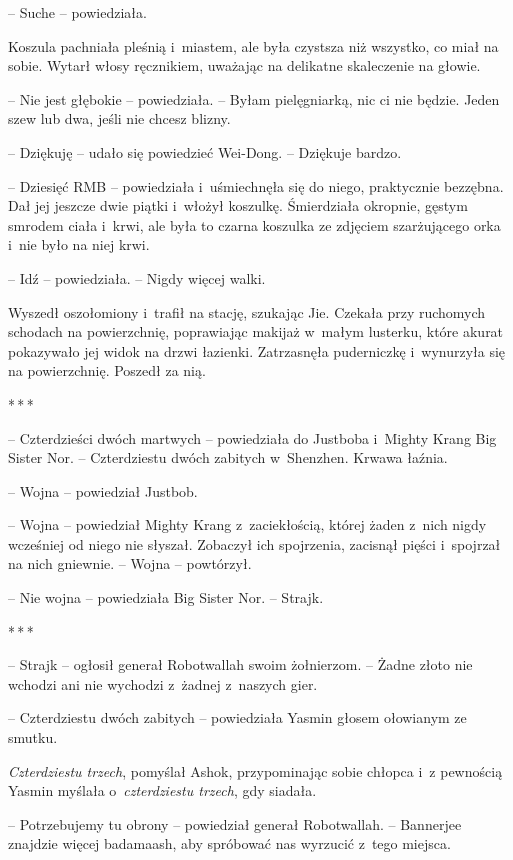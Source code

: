 \documentclass[oneside,polish,11pt,rmheadings]{mwbk}
\newcommand{\threeast}{\par\centerline{*\,*\,*}\medskip\par}
\begin{document}
-- Suche -- powiedziała.

Koszula pachniała pleśnią i~miastem, ale była czystsza niż wszystko, co miał na sobie. Wytarł włosy ręcznikiem, uważając na delikatne skaleczenie na głowie.

-- Nie jest głębokie -- powiedziała. -- Byłam pielęgniarką, nic ci nie będzie. Jeden szew lub dwa, jeśli nie chcesz blizny.

-- Dziękuję -- udało się powiedzieć Wei-Dong. -- Dziękuje bardzo. 

-- Dziesięć RMB -- powiedziała i~uśmiechnęła się do niego, praktycznie bezzębna. Dał jej jeszcze dwie piątki i~włożył koszulkę. Śmierdziała okropnie, gęstym smrodem ciała i~krwi, ale była to czarna koszulka ze zdjęciem szarżującego orka i~nie było na niej krwi.

-- Idź -- powiedziała. -- Nigdy więcej walki. 

Wyszedł oszołomiony i~trafił na stację, szukając Jie. Czekała przy ruchomych schodach na powierzchnię, poprawiając makijaż w~małym lusterku, które akurat pokazywało jej widok na drzwi łazienki. Zatrzasnęła puderniczkę i~wynurzyła się na powierzchnię. Poszedł za nią.

\bigskip
\threeast

-- Czterdzieści dwóch martwych -- powiedziała do Justboba i~Mighty Krang Big Sister Nor. -- Czterdziestu dwóch zabitych w~Shenzhen. Krwawa łaźnia.

-- Wojna -- powiedział Justbob.

-- Wojna -- powiedział Mighty Krang z~zaciekłością, której żaden z~nich nigdy wcześniej od niego nie słyszał. Zobaczył ich spojrzenia, zacisnął pięści i~spojrzał na nich gniewnie. -- Wojna -- powtórzył.

-- Nie wojna -- powiedziała Big Sister Nor. -- Strajk.

\bigskip
\threeast

-- Strajk -- ogłosił generał Robotwallah swoim żołnierzom. -- Żadne złoto nie wchodzi ani nie wychodzi z~żadnej z~naszych gier.

-- Czterdziestu dwóch zabitych -- powiedziała Yasmin głosem ołowianym ze smutku.

\textit{Czterdziestu trzech}, pomyślał Ashok, przypominając sobie chłopca i~z pewnością Yasmin myślała o~\textit{czterdziestu trzech}, gdy siadała.

-- Potrzebujemy tu obrony -- powiedział generał Robotwallah. -- Bannerjee znajdzie więcej badamaash, aby spróbować nas wyrzucić z~tego miejsca.
\end{document}
